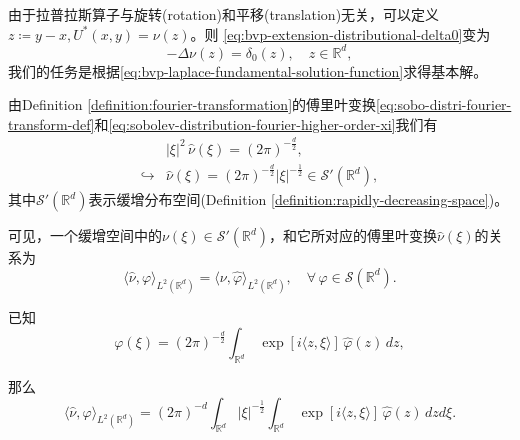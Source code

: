 由于拉普拉斯算子与旋转(rotation)和平移(translation)无关，可以定义$z \coloneqq y-x, U^{*}(x,y) = \nu(z)$。则  \eqref{eq:bvp-extension-distributional-delta0}变为
\begin{equation}
  \label{eq:bvp-laplace-fundamental-solution-function}
  - \Delta \nu(z) = \delta_0(z), \quad z \in \mathbb{R}^d,
\end{equation}
我们的任务是根据\eqref{eq:bvp-laplace-fundamental-solution-function}求得基本解。

由Definition \ref{definition:fourier-transformation}的傅里叶变换\eqref{eq:sobo-distri-fourier-transform-def}和\eqref{eq:sobolev-distribution-fourier-higher-order-xi}我们有
\begin{equation*}
  \begin{split}
    & \big| \xi \big|^{2} \, \widehat{\nu}(\xi) = \left( 2 \pi \right)^{-\frac{d}{2}}, \\
    \hookrightarrow & \widehat{\nu}(\xi) =\left( 2 \pi \right)^{-\frac{d}{2}} \big| \xi \big|^{-\frac{1}{2}} \in \mathcal{S}'(\mathbb{R}^{d}),
  \end{split}
\end{equation*}
其中$\mathcal{S}'(\mathbb{R}^{d})$表示缓增分布空间(Definition \ref{definition:rapidly-decreasing-space})。

可见，一个缓增空间中的$\nu(\xi) \in \mathcal{S}'(\mathbb{R}^{d})$，和它所对应的傅里叶变换$\widehat{\nu}(\xi)$的关系为
\begin{equation*}
  \langle \widehat{\nu}, \varphi \rangle_{L^{2}(\mathbb{R}^{d})} =
  \langle \nu, \widehat{\varphi} \rangle_{L^{2}(\mathbb{R}^{d})},
  \quad \forall \, \varphi \in \mathcal{S}(\mathbb{R}^{d}).
\end{equation*}

已知
\begin{equation*}
  \varphi(\xi) = \left( 2 \pi \right)^{-\frac{d}{2}} \int_{\mathbb{R}^{d}} \, \exp \left[ i \langle z, \xi \rangle \right] \,
  \widehat{\varphi}(z) \, dz,
\end{equation*}

那么
\begin{equation*}
  \langle \widehat{\nu}, \varphi \rangle_{L^{2}(\mathbb{R}^{d})}
  = \left( 2 \pi \right)^{-d}
  \int_{\mathbb{R}^{d}} \big| \xi \big|^{-\frac{1}{2}}
  \int_{\mathbb{R}^{d}} \, \exp \left[ i \langle z, \xi \rangle \right] \,
  \widehat{\varphi}(z) \, dz
  d \xi.
\end{equation*}


